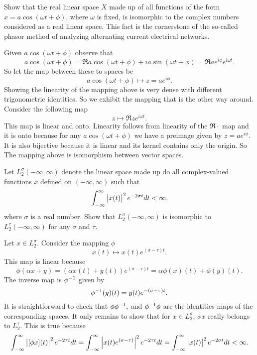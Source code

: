 \begin{problem}
	Show that the real linear space $ X $ made up of all functions of the form $ x = a\cos(\omega t+\phi) $, where $ \omega $ is fixed, is isomorphic to the complex numbers considered as a real linear space. This fact is the cornerstone of the so-called phasor method of analyzing alternating current electrical networks.
\end{problem}
\begin{solution}
	Given $ a\cos(\omega t+\phi) $ observe that
	\[ a\cos(\omega t+\phi) = \Re{a\cos(\omega t+\phi) + ia\sin(\omega t+\phi)} = \Re{ae^{i\phi}e^{i\omega t}}. \]
	So let the map between these to spaces be
	\[ a\cos(\omega t+\phi) \mapsto z=ae^{i\phi}. \]
	Showing the linearity of the mapping above is very dense with different trigonometric identities. So we exhibit the mapping that is the other way around. Consider the following map
	\[ z \mapsto \Re{ze^{i\omega t}}. \]
	This map is linear and onto. Linearity follows from linearity of the $ \Re{\cdot} $ map and it is onto because for any $ a\cos(\omega t + \phi) $ we have a preimage given by $ z = ae^{i\phi} $. It is also bijective because it is linear and its kernel contains only the origin. So The mapping above is isomorphism between vector spaces.
\end{solution}

\begin{problem}
	Let $ L_2^\sigma(-\infty,\infty) $ denote the linear space made up do all complex-valued functions $ x $ defined on $ (-\infty,\infty) $ such that
	\[ \int_{-\infty}^{\infty}\left|x(t)\right|^2e^{-2\sigma t} dt < \infty, \]
	where $ \sigma $ is a real number. Show that $ L_2^\sigma(-\infty,\infty) $ is isomorphic to $ L_2^\tau(-\infty,\infty) $ for any $ \sigma $ and $ \tau $.
\end{problem}


\begin{solution}
	Let $ x\in L_2^\sigma $. Consider the mapping $ \phi $
	\[ x(t) \mapsto x(t)e^{(\sigma-\tau)t}. \]
	This map is linear because
	\[ \phi(\alpha x + y) = (\alpha x(t)+y(t))e^{(\sigma-\tau)t} = \alpha\phi(x)(t) + \phi(y)(t). \]
	The inverse map is $ \phi^{-1} $ given by
	\[ \phi^{-1}(y)(t) = y(t)e^{-(\sigma-\tau)t}.  \]
	It is straightforward to check that $ \phi\phi^{-1},$ and $\phi^{-1}\phi $ are the identities maps of the corresponding spaces. It only remains to show that for $ x\in L_2^\sigma $, $ \phi x $ really belongs to $ L_2^\tau $. This is true because
	\[ \int_{-\infty}^{\infty}\left|[\phi x](t)\right|^2 e^{-2\tau t}dt =\int_{-\infty}^{\infty}\left|x(t)e^{(\sigma -\tau)}\right|^2 e^{-2\tau t}dt = \int_{-\infty}^{\infty}\left|x(t)\right|^2 e^{-2\sigma t}dt < \infty.  \] 
\end{solution}


